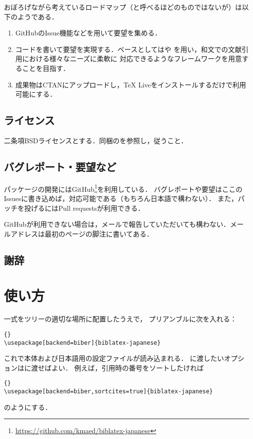 \documentclass[lualatex,ja=standard,magstyle=real]{bxjsarticle}
\begin{document}
おぼろげながら考えているロードマップ（と呼べるほどのものではないが）は以下のようである．
\begin{enumerate}
\item GitHubのIssue機能などを用いて要望を集める．
\item コードを書いて要望を実現する．ベースとしてはや
  を用い，和文での文献引用における様々なニーズに柔軟に
  対応できるようなフレームワークを用意することを目指す．
\item 成果物はCTANにアップロードし，\TeX{} Liveをインストールするだけで利用可能にする．
\end{enumerate}

\subsection{ライセンス}
二条項BSDライセンスとする．同梱のを参照し，従うこと．

\subsection{バグレポート・要望など}
パッケージの開発にはGitHub\footnote{\url{https://github.com/kmaed/biblatex-japanese}}を利用している．
バグレポートや要望はここのIssuesに書き込めば，対応可能である（もちろん日本語で構わない）．
また，パッチを投げるにはPull requestsが利用できる．

GitHubが利用できない場合は，メールで報告していただいても構わない．メールアドレスは最初のページの脚注に書いてある．

\subsection{謝辞}


\section{使い方}
一式をツリーの適切な場所に配置したうえで，
プリアンブルに次を入れる：
\begin{lstlisting}[style=latex]{}
\usepackage[backend=biber]{biblatex-japanese}
\end{lstlisting}
これで本体および日本語用の設定ファイルが読み込まれる．
に渡したいオプションはに渡せばよい．
例えば，引用時の番号をソートしたければ
\begin{lstlisting}[style=latex]{}
\usepackage[backend=biber,sortcites=true]{biblatex-japanese}
\end{lstlisting}
のようにする．
\end{document}
